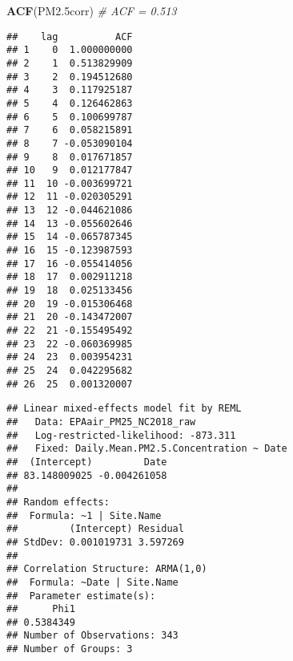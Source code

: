 \documentclass[]{article}
\newenvironment{Shaded}{\begin{snugshade}}{\end{snugshade}}
\newcommand{\KeywordTok}[1]{\textcolor[rgb]{0.13,0.29,0.53}{\textbf{#1}}}
\newcommand{\DataTypeTok}[1]{\textcolor[rgb]{0.13,0.29,0.53}{#1}}
\newcommand{\DecValTok}[1]{\textcolor[rgb]{0.00,0.00,0.81}{#1}}
\newcommand{\FloatTok}[1]{\textcolor[rgb]{0.00,0.00,0.81}{#1}}
\newcommand{\StringTok}[1]{\textcolor[rgb]{0.31,0.60,0.02}{#1}}
\newcommand{\CommentTok}[1]{\textcolor[rgb]{0.56,0.35,0.01}{\textit{#1}}}
\newcommand{\OperatorTok}[1]{\textcolor[rgb]{0.81,0.36,0.00}{\textbf{#1}}}
\newcommand{\NormalTok}[1]{#1}
\begin{document}
\begin{Shaded}
\begin{Highlighting}[]
\KeywordTok{ACF}\NormalTok{(PM2.5corr) }\CommentTok{# ACF = 0.513}
\end{Highlighting}
\end{Shaded}

\begin{verbatim}
##    lag          ACF
## 1    0  1.000000000
## 2    1  0.513829909
## 3    2  0.194512680
## 4    3  0.117925187
## 5    4  0.126462863
## 6    5  0.100699787
## 7    6  0.058215891
## 8    7 -0.053090104
## 9    8  0.017671857
## 10   9  0.012177847
## 11  10 -0.003699721
## 12  11 -0.020305291
## 13  12 -0.044621086
## 14  13 -0.055602646
## 15  14 -0.065787345
## 16  15 -0.123987593
## 17  16 -0.055414056
## 18  17  0.002911218
## 19  18  0.025133456
## 20  19 -0.015306468
## 21  20 -0.143472007
## 22  21 -0.155495492
## 23  22 -0.060369985
## 24  23  0.003954231
## 25  24  0.042295682
## 26  25  0.001320007
\end{verbatim}

\begin{Shaded}
\end{Shaded}

\begin{verbatim}
## Linear mixed-effects model fit by REML
##   Data: EPAair_PM25_NC2018_raw 
##   Log-restricted-likelihood: -873.311
##   Fixed: Daily.Mean.PM2.5.Concentration ~ Date 
##  (Intercept)         Date 
## 83.148009025 -0.004261058 
## 
## Random effects:
##  Formula: ~1 | Site.Name
##         (Intercept) Residual
## StdDev: 0.001019731 3.597269
## 
## Correlation Structure: ARMA(1,0)
##  Formula: ~Date | Site.Name 
##  Parameter estimate(s):
##      Phi1 
## 0.5384349 
## Number of Observations: 343
## Number of Groups: 3
\end{verbatim}
\end{document}
